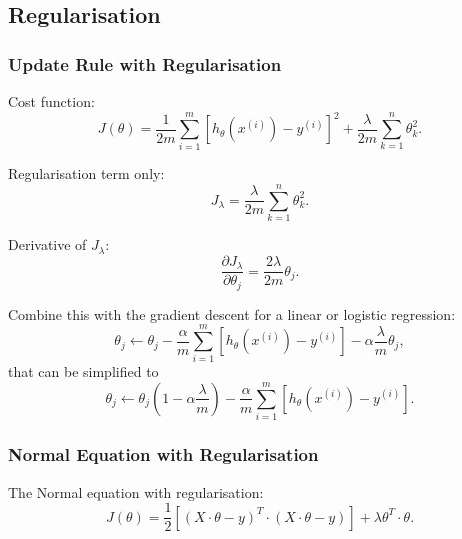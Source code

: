 \documentclass[a4paper,11pt]{article}
\begin{document}
\subsection{Regularisation}
\subsubsection{Update Rule with Regularisation}
Cost function:
\begin{equation}
J \left( \theta \right) = \frac{1}{2m} \sum_{i=1} ^m \left[ h_\theta \left(x^{(i)} \right) - y^{(i)} \right]^2 + \frac{\lambda}{2m} \sum_{k=1} ^n \theta_k ^2 .
\end{equation}

Regularisation term only:
\begin{equation}
J_\lambda = \frac{\lambda}{2m} \sum_{k=1} ^n \theta_k ^2 .
\end{equation}

Derivative of \textcolor{OliveGreen}{$J_\lambda$}:
\begin{equation}
\frac{\partial J_\lambda}{\partial \theta_j} = \frac{2\lambda}{2m} \theta_j .
\end{equation}

Combine this with the gradient descent for a linear or logistic regression:
\begin{equation}
\theta_j \leftarrow \theta_j - \frac{\alpha}{m} \sum_{i=1} ^m \left[h_\theta \left(x^{(i)} \right) - y^{(i)} \right] - \alpha \frac{\lambda}{m} \theta_j ,
\end{equation}
that can be simplified to
\begin{equation}
\theta_j \leftarrow \theta_j \left(1 - \alpha \frac{\lambda}{m} \right) - \frac{\alpha}{m} \sum_{i=1} ^m \left[h_\theta \left(x^{(i)} \right) - y^{(i)} \right] .
\end{equation}
\subsubsection{Normal Equation with Regularisation}
The Normal equation with regularisation:
\begin{equation}
J \left(\theta \right) = \frac{1}{2} \left[ \left(X \cdot \theta - y \right)^T \cdot \left(X \cdot \theta - y \right) \right] + \lambda \theta^T \cdot \theta .
\end{equation}
\end{document}
